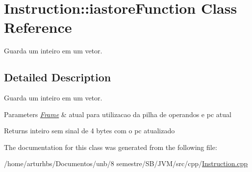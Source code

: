 \hypertarget{classInstruction_1_1iastoreFunction}{}\section{Instruction\+:\+:iastore\+Function Class Reference}
\label{classInstruction_1_1iastoreFunction}


Guarda um inteiro em um vetor.  




\subsection{Detailed Description}
Guarda um inteiro em um vetor. 


\begin{DoxyParams}{Parameters}
{\em \hyperlink{classFrame}{Frame}} & atual para utilizacao da pilha de operandos e pc atual \\
\hline
\end{DoxyParams}
\begin{DoxyReturn}{Returns}
inteiro sem sinal de 4 bytes com o pc atualizado 
\end{DoxyReturn}


The documentation for this class was generated from the following file\+:\begin{DoxyCompactItemize}
\item 
/home/arturhbs/\+Documentos/unb/8 semestre/\+S\+B/\+J\+V\+M/src/cpp/\hyperlink{Instruction_8cpp}{Instruction.\+cpp}\end{DoxyCompactItemize}
